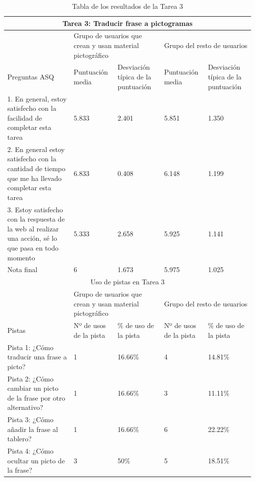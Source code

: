 \begin{table}
\begin{tabular}{ |p{4cm}|p{2cm}|p{2cm}|p{2cm}|p{2cm}|  }
	\hline
	\multicolumn{5}{|c|}{Tarea 3: Traducir frase a pictogramas} \\
	\hline
	& \multicolumn{2}{p{4cm}|}{Grupo de usuarios que crean y usan material pictográfico} & \multicolumn{2}{p{4cm}|}{Grupo del resto de usuarios }  \\ 
	\hline
	Preguntas ASQ & Puntuación media  &Desviación típica de la puntuación & Puntuación media & Desviación típica de la puntuación\\
	\hline
	1. En general, estoy satisfecho con la facilidad de completar esta tarea &5.833  &2.401 &5.851  &1.350\\
	\hline
	2. En general estoy satisfecho con la cantidad de tiempo que me ha llevado completar esta tarea &6.833  &0.408 &6.148 &1.199\\
	\hline
	3. Estoy satisfecho con la respuesta de la web al realizar una acción, sé lo que pasa en todo momento &5.333 &2.658 &5.925  &1.141\\
	\hline
	Nota final &6 &1.673 &5.975 &1.025\\
	\hline
	\multicolumn{5}{|c|}{Uso de pistas en Tarea 3} \\
	\hline
	& \multicolumn{2}{p{4cm}|}{Grupo de usuarios que crean y usan material pictográfico} & \multicolumn{2}{p{4cm}|}{Grupo del resto de usuarios }  \\ 
	\hline
	Pistas &Nº de usos de la pista &\% de uso de la pista&Nº de usos de la pista&\% de uso de la pista\\
	\hline
	Pista 1: ¿Cómo traducir una frase a picto? &1  &16.66\% &4  &14.81\%\\
	\hline
	Pista 2: ¿Cómo cambiar un picto de la frase por otro alternativo? &1  &16.66\%  &3 &11.11\%\\
	\hline
	Pista 3: ¿Cómo añadir la frase al tablero? &1 &16.66\% &6   &22.22\%\\
	\hline
	Pista 4: ¿Cómo ocultar un picto de la frase? &3 &50\% &5   &18.51\%\\
	\hline

\end{tabular}
\caption{\label{tab:area3respuestas}Tabla de los resultados de la Tarea 3}
\end{table}

